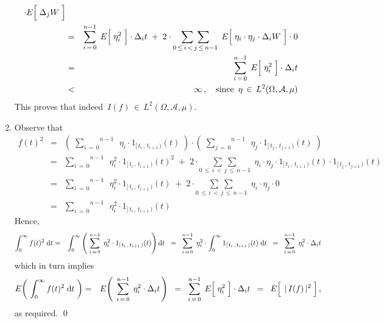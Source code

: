 \begin{enumerate}
\begin{eqnarray*}
		\cdot
		E\!\left[\; \overset{{\color{white}.}}{\Delta_{j}W} \;\right]
	\\
	& = &
		\overset{n-1}{\underset{i\,=\,0}{\sum}}\;\,
		E\!\left[\; \overset{{\color{white}.}}{\eta_{i}^{2}} \;\right] \cdot \Delta_{i}t
		\; + \;
		2 \cdot
		\underset{0 \,\leq\, i \,<\, j \,\leq\, n-1}{\sum\;\sum}\;\,
		E\!\left[\; \overset{{\color{white}1}}{\eta_{i}} \cdot \eta_{j} \cdot \Delta_{i}W \;\right]
		\cdot
		0
	\\
	& = &
		\overset{n-1}{\underset{i\,=\,0}{\sum}}\;\,
		E\!\left[\; \overset{{\color{white}.}}{\eta_{i}^{2}} \;\right] \cdot \Delta_{i}t
	\\
	& < &
		\infty\,,
		\quad\textnormal{since \,$\eta \,\in\, L^2(\Omega,\mathcal{A},\mu)$}
	\end{eqnarray*}
	This proves that indeed \,$I(f) \,\in\, L^{2}(\Omega,\mathcal{A},\mu)$.
\item
	Observe that
	\begin{eqnarray*}
	f(t)^{2}
	& = &
		\left(\;
			\overset{n-1}{\underset{i\,=\,0}{\sum}}\;\,
			\eta_{i} \cdot 1_{[\,t_{i}\,,\,t_{i+1}\,)}(t)
			\;\right)
		\cdot
		\left(\;
			\overset{n-1}{\underset{j\,=\,0}{\sum}}\;\,
			\eta_{j} \cdot 1_{[\,t_{j}\,,\,t_{j+1}\,)}(t)
			\;\right)
	\\
	& = &
		\overset{n-1}{\underset{i\,=\,0}{\sum}}\;\,
		\eta_{i}^{2} \cdot 1_{[\,t_{i}\,,\,t_{i+1}\,)}(t)^{2}
		\; + \;
		2 \cdot
		\underset{0\,\leq\,i\,<\,j\,\leq\,n-1}{\sum\;\sum}\;\,
		\eta_{i} \cdot \eta_{j}
		\cdot
		1_{[\,t_{i}\,,\,t_{i+1}\,)}(t)
		\cdot
		1_{[\,t_{j}\,,\,t_{j+1}\,)}(t)
	\\
	& = &
		\overset{n-1}{\underset{i\,=\,0}{\sum}}\;\,
		\eta_{i}^{2} \cdot 1_{[\,t_{i}\,,\,t_{i+1}\,)}(t)
		\; + \;
		2 \cdot
		\underset{0\,\leq\,i\,<\,j\,\leq\,n-1}{\sum\;\sum}\;\,
		\eta_{i} \cdot \eta_{j}
		\cdot
		0
	\\
	& = &
		\overset{n-1}{\underset{i\,=\,0}{\sum}}\;\,
		\eta_{i}^{2} \cdot 1_{[\,t_{i}\,,\,t_{i+1}\,)}(t)
	\end{eqnarray*}
	Hence,
	\begin{eqnarray*}
	\int_{0}^{\infty} f(t)^{2} \;\textnormal{d} t
	& = &
		\int_{0}^{\infty}
			\left(\;
				\overset{n-1}{\underset{i\,=\,0}{\sum}}\;\,
				\eta_{i}^{2} \cdot 1_{[\,t_{i}\,,\,t_{i+1}\,)}(t)
				\right)
		 	\textnormal{d} t
	\;\; = \;\;
		\overset{n-1}{\underset{i\,=\,0}{\sum}}\;\,
		\eta_{i}^{2} \cdot
		\int_{0}^{\infty} 1_{[\,t_{i}\,,\,t_{i+1}\,)}(t) \;\textnormal{d} t
	\;\; = \;\;
		\overset{n-1}{\underset{i\,=\,0}{\sum}}\;\,
		\eta_{i}^{2} \cdot \Delta_{i}t
	\end{eqnarray*}
	which in turn implies
	\begin{eqnarray*}
	E\!\left(\; \int_{0}^{\infty} f(t)^{2} \;\d t \;\right)
	& = &
		E\!\left(\;\,
			\overset{n-1}{\underset{i\,=\,0}{\sum}}\;\,
			\eta_{i}^{2} \cdot \Delta_{i}t
			\,\right)
	\;\; = \;\;
		\overset{n-1}{\underset{i\,=\,0}{\sum}}\;\,
		E\!\left[\; \overset{{\color{white}.}}{\eta_{i}^{2}} \;\right] \cdot \Delta_{i}t
	\;\; = \;\;
		E\!\left[\;\, \overset{{\color{white}.}}{\vert\, I(f) \,\vert^{2}} \;\right],
	\end{eqnarray*}
	as required.
	\qed
\end{enumerate}

